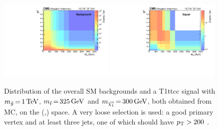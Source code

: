 \begin{figure}[htpb]
\centering
\includegraphics[width=0.49\textwidth]{figures/razor_variables/MR_R2_jet1ptg200_bg} 
\includegraphics[width=0.49\textwidth]{figures/razor_variables/MR_R2_jet1ptg200_sig}
\caption{Distribution of the overall SM backgrounds and a T1ttcc signal with $m_{\tilde{g}} \,{=}\,
1\,\text{Te\hspace{-.08em}V}$, $m_{\tilde{t}} \,{=}\, 325\,\text{Ge\hspace{-.08em}V}$ and $m_{\tilde{\chi}_1^0} \,{=}\, 300\,\text{Ge\hspace{-.08em}V}$, both obtained
from MC, on the (\mr,\rsq) space. A very loose selection is used:  a good primary vertex and at
least three jets, one of which should have $p_{\mathrm{T}} > 200$ \GeV. 
\label{fig:razor_MR_Rsq_bg_signal}}

\end{figure}


